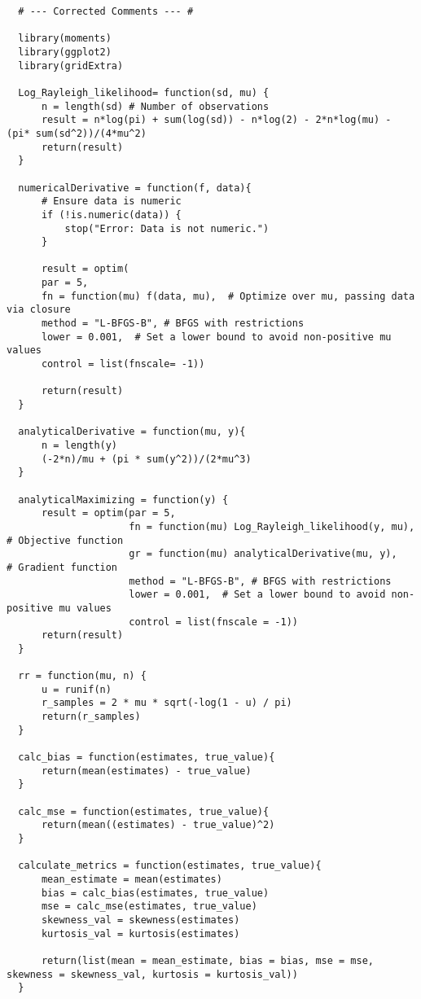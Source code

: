 \documentclass{report}
\begin{document}
\begin{verbatim}
  # --- Corrected Comments --- #

  library(moments)
  library(ggplot2)
  library(gridExtra)
  
  Log_Rayleigh_likelihood= function(sd, mu) {
      n = length(sd) # Number of observations
      result = n*log(pi) + sum(log(sd)) - n*log(2) - 2*n*log(mu) - (pi* sum(sd^2))/(4*mu^2) 
      return(result)
  }
  
  numericalDerivative = function(f, data){
      # Ensure data is numeric
      if (!is.numeric(data)) {
          stop("Error: Data is not numeric.")
      }
  
      result = optim(
      par = 5,
      fn = function(mu) f(data, mu),  # Optimize over mu, passing data via closure 
      method = "L-BFGS-B", # BFGS with restrictions
      lower = 0.001,  # Set a lower bound to avoid non-positive mu values
      control = list(fnscale= -1))
      
      return(result)
  }
  
  analyticalDerivative = function(mu, y){
      n = length(y)
      (-2*n)/mu + (pi * sum(y^2))/(2*mu^3)
  }
  
  analyticalMaximizing = function(y) {
      result = optim(par = 5, 
                     fn = function(mu) Log_Rayleigh_likelihood(y, mu), # Objective function
                     gr = function(mu) analyticalDerivative(mu, y),    # Gradient function
                     method = "L-BFGS-B", # BFGS with restrictions
                     lower = 0.001,  # Set a lower bound to avoid non-positive mu values
                     control = list(fnscale = -1))
      return(result)
  }
  
  rr = function(mu, n) {
      u = runif(n)
      r_samples = 2 * mu * sqrt(-log(1 - u) / pi)
      return(r_samples)
  }
  
  calc_bias = function(estimates, true_value){
      return(mean(estimates) - true_value)
  }
  
  calc_mse = function(estimates, true_value){
      return(mean((estimates) - true_value)^2)
  }
  
  calculate_metrics = function(estimates, true_value){
      mean_estimate = mean(estimates)
      bias = calc_bias(estimates, true_value)
      mse = calc_mse(estimates, true_value)
      skewness_val = skewness(estimates)
      kurtosis_val = kurtosis(estimates) 
  
      return(list(mean = mean_estimate, bias = bias, mse = mse, skewness = skewness_val, kurtosis = kurtosis_val))
  }
  

\end{verbatim}
\end{document}
